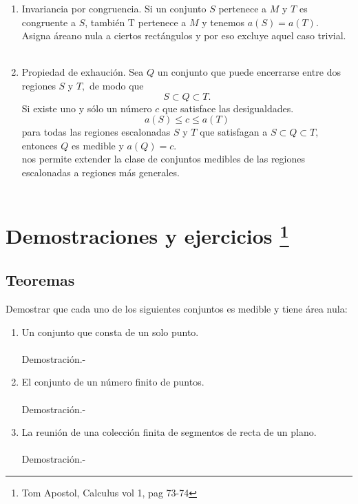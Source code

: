 \begin{tcolorbox}
\begin{enumerate}[\bfseries 5.]
\item Invariancia por congruencia. Si un conjunto $S$ pertenece a $M$ y $T$ es congruente a $S$, también T pertenece a $M$ y tenemos $a(S) = a(T).$\\
Asigna áreano nula a ciertos rectángulos y por eso excluye aquel caso trivial. \\\\

\item Propiedad de exhaución. Sea $Q$ un conjunto que puede encerrarse entre dos regiones $S$ y $T,$ de modo que $$ S \subset Q \subset T.$$  
Si existe uno y sólo un número $c$ que satisface las desigualdades. $$a(S) \leq c \leq a(T)$$
para todas las regiones escalonadas $S$ y $T$ que satisfagan a $S \subset Q \subset T,$ entonces $Q$ es medible y $a(Q)=c.$\\
nos permite extender la clase de conjuntos medibles de las regiones escalonadas a regiones más generales.\\\\
\end{enumerate}
\end{tcolorbox}

\section[Ejercicios y demostraciones]{Demostraciones y ejercicios \footnote{Tom Apostol, Calculus vol 1, pag 73-74}}
\subsection{Teoremas}

\begin{teo}
Demostrar que cada uno de los siguientes conjuntos es medible y tiene área nula:
\begin{enumerate}[\bfseries a)]
\item Un conjunto que consta de un solo punto.\\\\
Demostración.- \;

\item El conjunto de un número finito de puntos.\\\\
Demostración.- \; 

\item La reunión de una colección finita de segmentos de recta de un plano. \\\\
Demostración.- \; 
\end{enumerate}
\end{teo}